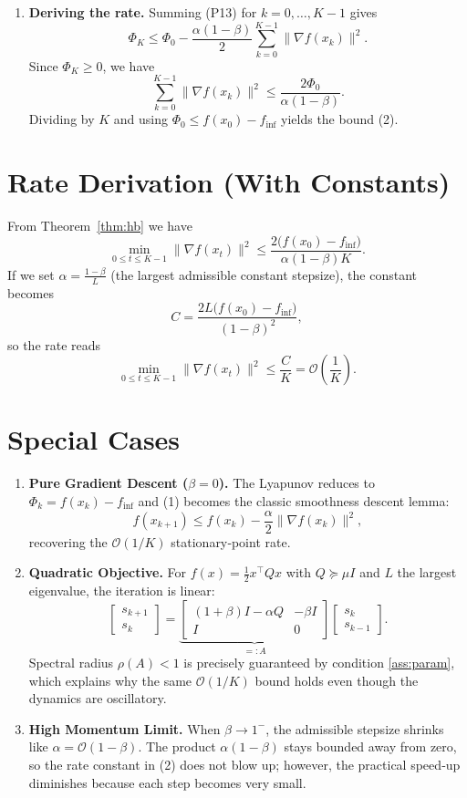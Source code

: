 \documentclass{article}
\begin{document}
\begin{enumerate}
\item\textbf{Deriving the rate.}  
Summing (P13) for $k=0,\dots,K-1$ gives
\[
\Phi_{K}\le \Phi_{0}
-\frac{\alpha(1-\beta)}{2}\sum_{k=0}^{K-1}\|\nabla f(x_{k})\|^{2}.
\]
Since $\Phi_{K}\ge 0$, we have
\[
\sum_{k=0}^{K-1}\|\nabla f(x_{k})\|^{2}
\le \frac{2\Phi_{0}}{\alpha(1-\beta)}.
\]
Dividing by $K$ and using $\Phi_{0}\le f(x_{0})-f_{\inf}$ yields the bound (2). \hfill\qedsymbol
\end{enumerate}

\section*{Rate Derivation (With Constants)}
From Theorem~\ref{thm:hb} we have
\[
\min_{0\le t\le K-1}\|\nabla f(x_{t})\|^{2}
\le \frac{2\bigl(f(x_{0})-f_{\inf}\bigr)}{\alpha(1-\beta)K}.
\]
If we set $\alpha = \frac{1-\beta}{L}$ (the largest admissible constant stepsize), the constant becomes
\[
C=\frac{2L\bigl(f(x_{0})-f_{\inf}\bigr)}{(1-\beta)^{2}},
\]
so the rate reads
\[
\min_{0\le t\le K-1}\|\nabla f(x_{t})\|^{2}
\le \frac{C}{K}= \mathcal{O}\!\left(\frac{1}{K}\right).
\]

\section*{Special Cases}
\begin{enumerate}[leftmargin=*]
\item \textbf{Pure Gradient Descent ($\beta=0$).}  
The Lyapunov reduces to $\Phi_{k}=f(x_{k})-f_{\inf}$ and (1) becomes the classic smoothness descent lemma:
\[
f(x_{k+1})\le f(x_{k})-\frac{\alpha}{2}\|\nabla f(x_{k})\|^{2},
\]
recovering the $\mathcal{O}(1/K)$ stationary‑point rate.

\item \textbf{Quadratic Objective.}  
For $f(x)=\frac{1}{2}x^{\top}Qx$ with $Q\succeq \mu I$ and $L$ the largest eigenvalue, the iteration is linear:
\[
\begin{bmatrix}s_{k+1}\\ s_{k}\end{bmatrix}
=
\underbrace{\begin{bmatrix}
(1+\beta)I-\alpha Q & -\beta I\\
I & 0
\end{bmatrix}}_{=:A}
\begin{bmatrix}s_{k}\\ s_{k-1}\end{bmatrix}.
\]
Spectral radius $\rho(A)<1$ is precisely guaranteed by condition \eqref{ass:param}, which explains why the same $\mathcal{O}(1/K)$ bound holds even though the dynamics are oscillatory.

\item \textbf{High Momentum Limit.}  
When $\beta\to 1^{-}$, the admissible stepsize shrinks like $\alpha= \mathcal{O}(1-\beta)$. The product $\alpha(1-\beta)$ stays bounded away from zero, so the rate constant in (2) does not blow up; however, the practical speed‑up diminishes because each step becomes very small.
\end{enumerate}
\end{document}
